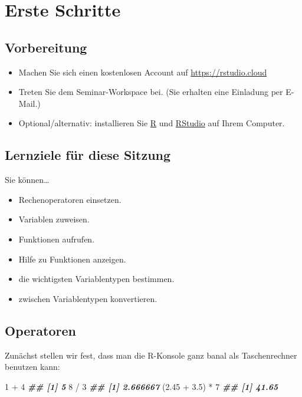 \documentclass[11pt,german,a4paper]{article}
\newenvironment{Shaded}{\begin{snugshade}}{\end{snugshade}}
\newcommand{\DecValTok}[1]{\textcolor[rgb]{0.00,0.00,0.81}{#1}}
\newcommand{\DocumentationTok}[1]{\textcolor[rgb]{0.56,0.35,0.01}{\textbf{\textit{#1}}}}
\newcommand{\FloatTok}[1]{\textcolor[rgb]{0.00,0.00,0.81}{#1}}
\newcommand{\NormalTok}[1]{#1}
\newcommand{\SpecialCharTok}[1]{\textcolor[rgb]{0.00,0.00,0.00}{#1}}
\providecommand{\tightlist}{%
  \setlength{\itemsep}{0pt}\setlength{\parskip}{0pt}}
\begin{document}
\hypertarget{erste-schritte}{%
\section{Erste Schritte}\label{erste-schritte}}

\hypertarget{vorbereitung}{%
\subsection{Vorbereitung}\label{vorbereitung}}

\begin{itemize}
\tightlist
\item
  Machen Sie sich einen kostenlosen Account auf \url{https://rstudio.cloud}
\item
  Treten Sie dem Seminar-Workspace bei. (Sie erhalten eine Einladung per E-Mail.)
\item
  Optional/alternativ: installieren Sie \href{https://www.r-project.org/}{R} und \href{https://rstudio.com/}{RStudio} auf Ihrem Computer.
\end{itemize}

\hypertarget{lernziele-fuxfcr-diese-sitzung}{%
\subsection{Lernziele für diese Sitzung}\label{lernziele-fuxfcr-diese-sitzung}}

Sie können\ldots{}

\begin{itemize}
\tightlist
\item
  Rechenoperatoren einsetzen.
\item
  Variablen zuweisen.
\item
  Funktionen aufrufen.
\item
  Hilfe zu Funktionen anzeigen.
\item
  die wichtigsten Variablentypen bestimmen.
\item
  zwischen Variablentypen konvertieren.
\end{itemize}

\hypertarget{operatoren}{%
\subsection{Operatoren}\label{operatoren}}

Zunächst stellen wir fest, dass man die R-Konsole ganz banal als Taschenrechner benutzen kann:

\begin{Shaded}
\begin{Highlighting}[]
\DecValTok{1} \SpecialCharTok{+} \DecValTok{4}
\DocumentationTok{\#\# [1] 5}
\DecValTok{8} \SpecialCharTok{/} \DecValTok{3}
\DocumentationTok{\#\# [1] 2.666667}
\NormalTok{(}\FloatTok{2.45} \SpecialCharTok{+} \FloatTok{3.5}\NormalTok{) }\SpecialCharTok{*} \DecValTok{7}
\DocumentationTok{\#\# [1] 41.65}
\end{Highlighting}
\end{Shaded}
\end{document}
